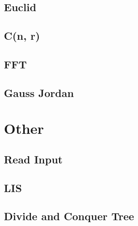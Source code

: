\documentclass[a4paper,landscape]{article}
\begin{document}
\begin{multicols}{2}
\subsection{Euclid}
	
\subsection{C(n, r)}
	
\subsection{FFT}
	
\subsection{Gauss Jordan}
	

\section{Other}
\subsection{Read Input}
	
\subsection{LIS}
	
\subsection{Divide and Conquer Tree}
	

\end{multicols}
\end{document}
